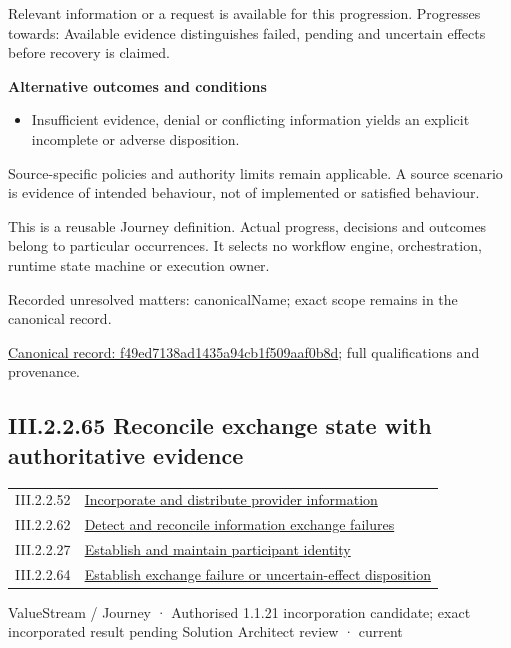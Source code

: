 Relevant information or a request is available for this progression. Progresses towards: Available evidence distinguishes failed, pending and uncertain effects before recovery is claimed.



\par\medskip\textbf{Alternative outcomes and conditions}\par


\begin{itemize}


\item Insufficient evidence, denial or conflicting information yields an explicit incomplete or adverse disposition.

\end{itemize}


Source-specific policies and authority limits remain applicable. A source scenario is evidence of intended behaviour, not of implemented or satisfied behaviour.



This is a reusable Journey definition. Actual progress, decisions and outcomes belong to particular occurrences. It selects no workflow engine, orchestration, runtime state machine or execution owner.


{\small Recorded unresolved matters: canonicalName; exact scope remains in the canonical record.}\par
{\footnotesize \href{../../../../continuum/strategy/value-stream/f49ed7138ad1435a94cb1f509aaf0b8d.md}{Canonical record: f49ed7138ad1435a94cb1f509aaf0b8d}; full qualifications and provenance.}\par
\subsection*{III.2.2.65 Reconcile exchange state with authoritative evidence}
\label{navigation:III.2.2.65}

\begin{longtable}{p{.22\linewidth}p{.73\linewidth}}
III.2.2.52 & \hyperref[element:9eb9f3210d5e4b46ac21463f54e62ab9]{Incorporate and distribute provider information} \\
III.2.2.62 & \hyperref[element:ad3479bfcefb4cc4b562e146f68eb579]{Detect and reconcile information exchange failures} \\
III.2.2.27 & \hyperref[element:f0ce31d5b71c4c5ab37ade566b224808]{Establish and maintain participant identity} \\
III.2.2.64 & \hyperref[element:f49ed7138ad1435a94cb1f509aaf0b8d]{Establish exchange failure or uncertain-effect disposition} \\
\end{longtable}
\label{element:08c2d05dd0174cc28288ed4ab0bc05d2}
{\small ValueStream / Journey · Authorised 1.1.21 incorporation candidate; exact incorporated result pending Solution Architect review · current}\par

